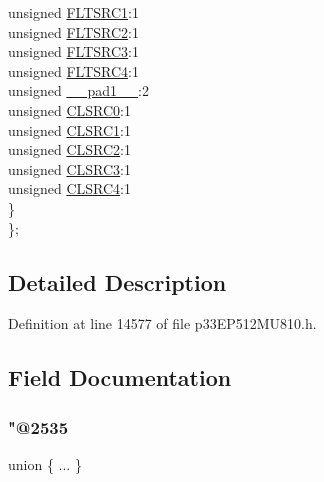 \begin{DoxyCompactItemize}
\begin{tabbing}
\>\>unsigned \hyperlink{structtag_f_c_l_c_o_n3_b_i_t_s_a7e2dde44582a2b4411afb97f93704738}{FLTSRC1}:1\\
\>\>unsigned \hyperlink{structtag_f_c_l_c_o_n3_b_i_t_s_a41a56979130beaf62e52443409af0daf}{FLTSRC2}:1\\
\>\>unsigned \hyperlink{structtag_f_c_l_c_o_n3_b_i_t_s_a919f99b1241a5f4d92f40778ec6b91a8}{FLTSRC3}:1\\
\>\>unsigned \hyperlink{structtag_f_c_l_c_o_n3_b_i_t_s_afedaf58b1e4d19481bb47b44b59ecbc3}{FLTSRC4}:1\\
\>\>unsigned \hyperlink{structtag_f_c_l_c_o_n3_b_i_t_s_acaf2d0924a107ec6e8d2e31febaf66f9}{\_\_pad1\_\_}:2\\
\>\>unsigned \hyperlink{structtag_f_c_l_c_o_n3_b_i_t_s_a0a945873cb44d41b241b83b08b599880}{CLSRC0}:1\\
\>\>unsigned \hyperlink{structtag_f_c_l_c_o_n3_b_i_t_s_a59f38630bf59c0035792456d75d03410}{CLSRC1}:1\\
\>\>unsigned \hyperlink{structtag_f_c_l_c_o_n3_b_i_t_s_a24cd8f779980ba4b721ab1d0d63648de}{CLSRC2}:1\\
\>\>unsigned \hyperlink{structtag_f_c_l_c_o_n3_b_i_t_s_a86b531e28879dfb3db317ce2147d381e}{CLSRC3}:1\\
\>\>unsigned \hyperlink{structtag_f_c_l_c_o_n3_b_i_t_s_a438bb199cbcc62bfd380ead48036accc}{CLSRC4}:1\\
\>\} \\
\}; \\

\end{tabbing}\end{DoxyCompactItemize}


\subsection{Detailed Description}


Definition at line 14577 of file p33\+E\+P512\+M\+U810.\+h.



\subsection{Field Documentation}
\mbox{\label{structtag_f_c_l_c_o_n3_b_i_t_s_ab5739c70876e80e538ecc3dbbbb9698f}} 
\subsubsection{\texorpdfstring{"@2535}{@2535}}
{\footnotesize\ttfamily union \{ ... \} }

